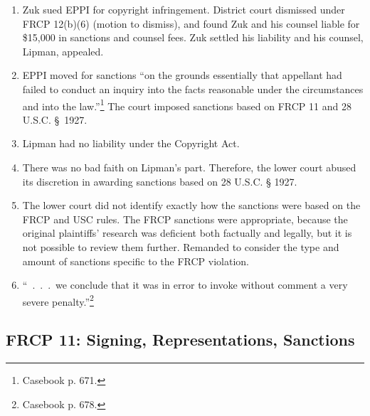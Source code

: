 \begin{enumerate}
    \item Zuk sued EPPI for copyright infringement. District court dismissed 
    under FRCP 12(b)(6) (motion to dismiss), and found Zuk and his counsel 
    liable for \$15,000 in sanctions and counsel fees. Zuk settled his 
    liability and his counsel, Lipman, appealed.
    \item EPPI moved for sanctions ``on the grounds essentially that appellant 
    had failed to conduct an inquiry into the facts reasonable under the 
    circumstances and into the law.''\footnote{Casebook p. 671.} The court 
    imposed sanctions based on FRCP 11 and 28 U.S.C. § 1927.
    \item Lipman had no liability under the Copyright Act.
    \item There was no bad faith on Lipman's part. Therefore, the lower court 
    abused its discretion in awarding sanctions based on 28 U.S.C. § 1927.
    \item The lower court did not identify exactly how the sanctions were 
    based on the FRCP and USC rules. The FRCP sanctions were appropriate, 
    because the original plaintiffs' research was deficient both factually and 
    legally, but it is not possible to review them further. Remanded to 
    consider the type and amount of sanctions specific to the FRCP violation.
    \item ``~.~.~.~we conclude that it was in error to invoke without comment a 
    very severe penalty.''\footnote{Casebook p. 678.}
\end{enumerate}

\subsection{FRCP 11: Signing, Representations, Sanctions}

